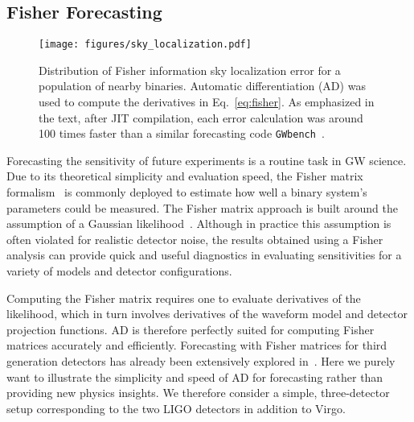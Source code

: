 \documentclass[twocolumn]{aastex631}
\begin{document}
\subsection{Fisher Forecasting}
\label{subsec:fisher}

\begin{figure}[t!]
    \centering
    \texttt{[image: figures/sky\_localization.pdf]}
    \caption{
        Distribution of Fisher information sky localization error for a population of nearby binaries.
        Automatic differentiation (AD) was used to compute the derivatives in Eq.~\eqref{eq:fisher}.
        As emphasized in the text, after JIT compilation, each error calculation was around 100 times faster than a similar forecasting code \texttt{GWbench}~\citep{Borhanian:2020ypi}.
    }
    \label{fig:sky_localization}
\end{figure}

Forecasting the sensitivity of future experiments is a routine task in GW science. 
Due to its theoretical simplicity and evaluation speed, the Fisher matrix formalism~\citep{Cornish:2010kf} is commonly deployed to estimate how well a binary system's parameters could be measured.
The Fisher matrix approach is built around the assumption of a Gaussian likelihood~\citep{Vallisneri:2007ev}.
Although in practice this assumption is often violated for realistic detector noise, the results obtained using a Fisher analysis can provide quick and useful diagnostics in evaluating sensitivities for a variety of models and detector configurations.

Computing the Fisher matrix requires one to evaluate derivatives of the likelihood, which in turn involves derivatives of the waveform model and detector projection functions.
AD is therefore perfectly suited for computing Fisher matrices accurately and efficiently. 
Forecasting with Fisher matrices for third generation detectors has already been extensively explored in~\citep{Iacovelli:2022bbs, Iacovelli:2022mbg}.
Here we purely want to illustrate the simplicity and speed of AD for forecasting rather than providing new physics insights.
We therefore consider a simple, three-detector setup corresponding to the two LIGO detectors in addition to Virgo.
\end{document}
